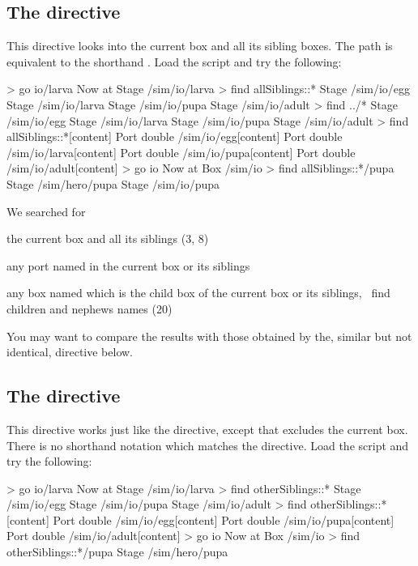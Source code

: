 %
%
\subsection{The  directive}
This directive looks into the current box and all its sibling boxes. The path  is equivalent to the shorthand . Load the  script and try the following:

\lstset{numbers=left}
\begin{usdialog}
> go io/larva
Now at Stage /sim/io/larva
> find allSiblings::*
Stage /sim/io/egg
Stage /sim/io/larva
Stage /sim/io/pupa
Stage /sim/io/adult
> find ../*
Stage /sim/io/egg
Stage /sim/io/larva
Stage /sim/io/pupa
Stage /sim/io/adult
> find allSiblings::*[content]
Port double /sim/io/egg[content]
Port double /sim/io/larva[content]
Port double /sim/io/pupa[content]
Port double /sim/io/adult[content]
> go io
Now at Box /sim/io
> find allSiblings::*/pupa
Stage /sim/hero/pupa
Stage /sim/io/pupa
\end{usdialog}
\lstset{numbers=none}

\noindent
We searched for 
\begin{compactitem}
\item the current box and all its siblings (3, 8)
\item any port named  in the current box or its siblings
\item any box named  which is the child box of the current box or its siblings, \ie\ find children and nephews names  (20)
\end{compactitem}

You may want to compare the results with those obtained by the, similar but not identical,  directive below.

%
%
\subsection{The  directive}
This directive works just like the  directive, except that  excludes the current box. There is no shorthand notation which matches the  directive. Load the  script and try the following:

\lstset{numbers=left}
\begin{usdialog}
> go io/larva
Now at Stage /sim/io/larva
> find otherSiblings::*
Stage /sim/io/egg
Stage /sim/io/pupa
Stage /sim/io/adult
> find otherSiblings::*[content]
Port double /sim/io/egg[content]
Port double /sim/io/pupa[content]
Port double /sim/io/adult[content]
> go io
Now at Box /sim/io
> find otherSiblings::*/pupa
Stage /sim/hero/pupa
\end{usdialog}
\lstset{numbers=none}

